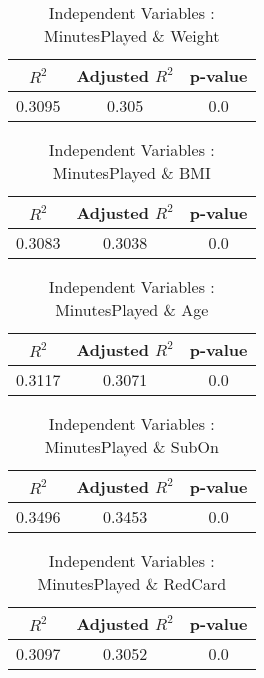 \documentclass[12pt]{article}
\begin{document}
\hfill
\begin{minipage}{0.4\textwidth}
	\begin{table}[H]
		\centering
		\caption{Independent Variables : MinutesPlayed \& Weight}\label{table:1a}
		{\begin{tabular}{|c|c|c|}
				\hline
				$ R^2 $ & Adjusted $ R^2 $ & p-value \\
				\hline
				0.3095 & 0.305 & 0.0 \\
				\hline
			\end{tabular}
		}
	\end{table}
\end{minipage}
\hfill
\begin{minipage}{0.4\textwidth}
	\begin{table}[H]
		\centering
		\caption{Independent Variables : MinutesPlayed \& BMI}\label{table:1a}
		{\begin{tabular}{|c|c|c|}
				\hline
				$ R^2 $ & Adjusted $ R^2 $ & p-value \\
				\hline
				0.3083 & 0.3038 & 0.0 \\
				\hline
			\end{tabular}
		}
	\end{table}
\end{minipage}
\hfill
\begin{minipage}{0.4\textwidth}
	\begin{table}[H]
		\centering
		\caption{Independent Variables : MinutesPlayed \& Age}\label{table:1a}
		{\begin{tabular}{|c|c|c|}
				\hline
				$ R^2 $ & Adjusted $ R^2 $ & p-value \\
				\hline
				0.3117 & 0.3071 & 0.0 \\
				\hline
			\end{tabular}
		}
	\end{table}
\end{minipage}
\hfill
\begin{minipage}{0.4\textwidth}
	\begin{table}[H]
		\centering
		\caption{Independent Variables : MinutesPlayed \& SubOn}\label{table:1a}
		{\begin{tabular}{|c|c|c|}
				\hline
				$ R^2 $ & Adjusted $ R^2 $ & p-value \\
				\hline
				0.3496 & 0.3453 & 0.0 \\
				\hline
			\end{tabular}
		}
	\end{table}
\end{minipage}
\hfill
\begin{minipage}{0.4\textwidth}
	\begin{table}[H]
		\centering
		\caption{Independent Variables : MinutesPlayed \& RedCard}\label{table:1a}
		{\begin{tabular}{|c|c|c|}
				\hline
				$ R^2 $ & Adjusted $ R^2 $ & p-value \\
				\hline
				0.3097 & 0.3052 & 0.0 \\
				\hline
			\end{tabular}
		}
	\end{table}
\end{minipage}
\end{document}
